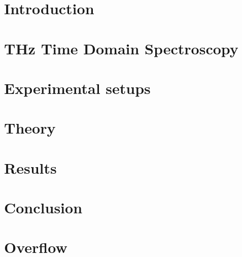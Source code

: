 \documentclass[12pt, a4paper]{report}
\begin{document}
\chapter{Introduction}
\setcounter{page}{1}


\chapter{THz Time Domain Spectroscopy}


\chapter{Experimental setups}


\chapter{Theory}


\chapter{Results}


\chapter{Conclusion}


\appendix
\chapter{Overflow}


\sloppy
\printbibliography

\end{document}
